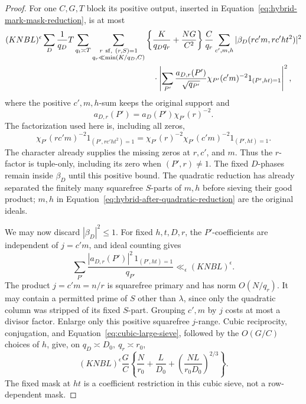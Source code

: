 \documentclass[11pt,a4paper]{article}
\numberwithin{equation}{section}
\numberwithin{figure}{section}
\theoremstyle{definition}
\theoremstyle{remark}
\begin{document}
\begin{proof}
For one \(C,G,T\) block its positive output, inserted in
Equation~\eqref{eq:hybrid-mark-mask-reduction}, is at most
\begin{equation}\label{eq:hybrid-after-quadratic-reduction}
 \begin{split}
 (KNBL)^\epsilon\sum_D\frac1{q_D}T\sum_{q_t\asymp T}
 \sum_{\substack{r\ {\rm sf},\ (r,S)=1\\q_r\ll\min(K/q_D,C)}}
 &\left\{\frac K{q_Dq_r}+\frac{NG}{C^2}\right\}\frac C{q_r}
 \sum_{c',m,h}|\beta_D(rc'm,rc'ht^2)|^2\\
 &\quad\cdot\left|
 \sum_{P'}\frac{a_{D,r}(P')}{\sqrt{q_{P'}}}
       \chi_{P'}(c'm)^{-2}1_{(P',ht)=1}
 \right|^2,
 \end{split}
\end{equation}
where the positive \(c',m,h\)-sum keeps the original support and
\[
 a_{D,r}(P')=a_D(P')\chi_{P'}(r)^{-2}.
\]
The factorization used here is, including all zeros,
\[
 \chi_{P'}(rc'm)^{-2}1_{(P',rc'ht^2)=1}
 =\chi_{P'}(r)^{-2}\chi_{P'}(c'm)^{-2}1_{(P',ht)=1}.
\]
The character already supplies the missing zeros at \(r,c'\), and \(m\).
Thus the \(r\)-factor is tuple-only, including its zero when \((P',r)\ne1\).
The fixed \(D\)-phases remain inside \(\beta_D\) until this positive bound.
The quadratic reduction has already separated the finitely many squarefree
\(S\)-parts of \(m,h\) before sieving their good product; \(m,h\) in
Equation~\eqref{eq:hybrid-after-quadratic-reduction} are the original ideals.

We may now discard \(|\beta_D|^2\le1\).  For fixed \(h,t,D,r\), the
\(P'\)-coefficients are independent of \(j=c'm\), and ideal counting gives
\[
 \sum_{P'}\frac{|a_{D,r}(P')|^2\,1_{(P',ht)=1}}{q_{P'}}
 \ll_\epsilon (KNBL)^\epsilon.
\]
The product \(j=c'm=n/r\) is squarefree primary and has norm \(O(N/q_r)\).
It may contain a permitted prime of \(S\) other than \(\lambda\), since only
the quadratic column was stripped of its fixed \(S\)-part.  Grouping \(c',m\)
by \(j\) costs at most a divisor factor.  Enlarge only this positive
squarefree \(j\)-range.  Cubic reciprocity, conjugation, and
Equation~\eqref{eq:cubic-large-sieve}, followed by the \(O(G/C)\) choices
of \(h\), give, on \(q_D\asymp D_0,\ q_r\asymp r_0\),
\begin{equation}\label{old-eq:4.6c}
 (KNBL)^\epsilon\frac GC
 \left\{\frac N{r_0}+\frac L{D_0}
       +\left(\frac{NL}{r_0D_0}\right)^{2/3}\right\}.
\end{equation}
The fixed mask at \(ht\) is a coefficient restriction in this cubic sieve,
not a row-dependent mask.


\end{proof}
\end{document}
